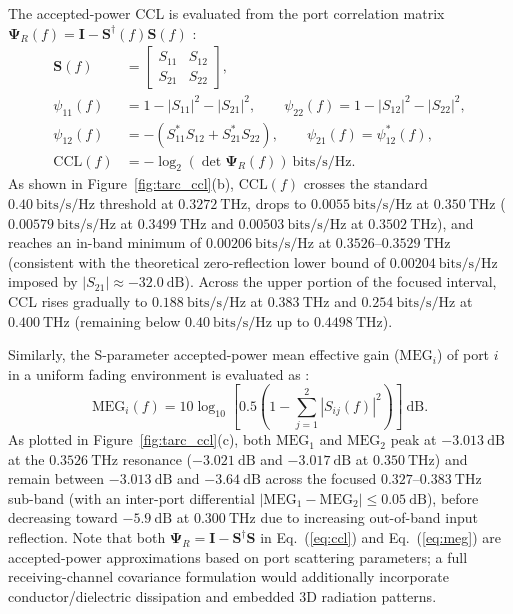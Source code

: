 \documentclass[referee,pdflatex,sn-mathphys-ay]{sn-jnl}
\begin{document}
The accepted-power CCL is evaluated from the port correlation matrix \(\boldsymbol{\Psi}_{R}(f)=\mathbf{I}-\mathbf{S}^{\dagger}(f)\mathbf{S}(f)\) \citep{MIMOReview2022}:
\begin{equation}
\begin{aligned}
\mathbf{S}(f)&=\begin{bmatrix}S_{11}&S_{12}\\S_{21}&S_{22}\end{bmatrix},\\
\psi_{11}(f)&=1-|S_{11}|^{2}-|S_{21}|^{2},\qquad
\psi_{22}(f)=1-|S_{12}|^{2}-|S_{22}|^{2},\\
\psi_{12}(f)&=-(S_{11}^{*}S_{12}+S_{21}^{*}S_{22}),\qquad
\psi_{21}(f)=\psi_{12}^{*}(f),\\
\mathrm{CCL}(f)&=-\log_{2}\!\left(\det\boldsymbol{\Psi}_{R}(f)\right)~\mathrm{bits/s/Hz}.
\end{aligned}
\label{eq:ccl}
\end{equation}
As shown in Figure~\ref{fig:tarc_ccl}(b), $\mathrm{CCL}(f)$ crosses the standard $0.40~\mathrm{bits/s/Hz}$ threshold at \(0.3272~\mathrm{THz}\), drops to \(0.0055~\mathrm{bits/s/Hz}\) at \(0.350~\mathrm{THz}\) ($0.00579~\mathrm{bits/s/Hz}$ at $0.3499~\mathrm{THz}$ and $0.00503~\mathrm{bits/s/Hz}$ at $0.3502~\mathrm{THz}$), and reaches an in-band minimum of \(0.00206~\mathrm{bits/s/Hz}\) at \(0.3526\)--\(0.3529~\mathrm{THz}\) (consistent with the theoretical zero-reflection lower bound of $0.00204~\mathrm{bits/s/Hz}$ imposed by $|S_{21}| \approx -32.0~\mathrm{dB}$). Across the upper portion of the focused interval, CCL rises gradually to \(0.188~\mathrm{bits/s/Hz}\) at \(0.383~\mathrm{THz}\) and \(0.254~\mathrm{bits/s/Hz}\) at \(0.400~\mathrm{THz}\) (remaining below $0.40~\mathrm{bits/s/Hz}$ up to $0.4498~\mathrm{THz}$).

Similarly, the S-parameter accepted-power mean effective gain (\(\mathrm{MEG}_{i}\)) of port \(i\) in a uniform fading environment is evaluated as \citep{MIMOReview2022}:
\begin{equation}
\mathrm{MEG}_{i}(f) = 10\log_{10}\!\left[0.5\left(1 - \sum_{j=1}^{2}|S_{ij}(f)|^{2}\right)\right]~\mathrm{dB}.
\label{eq:meg}
\end{equation}
As plotted in Figure~\ref{fig:tarc_ccl}(c), both $\mathrm{MEG}_1$ and $\mathrm{MEG}_2$ peak at \(-3.013~\mathrm{dB}\) at the $0.3526~\mathrm{THz}$ resonance (\(-3.021~\mathrm{dB}\) and \(-3.017~\mathrm{dB}\) at $0.350~\mathrm{THz}$) and remain between \(-3.013~\mathrm{dB}\) and \(-3.64~\mathrm{dB}\) across the focused \(0.327\)--\(0.383~\mathrm{THz}\) sub-band (with an inter-port differential $|\mathrm{MEG}_1 - \mathrm{MEG}_2| \le 0.05~\mathrm{dB}$), before decreasing toward \(-5.9~\mathrm{dB}\) at \(0.300~\mathrm{THz}\) due to increasing out-of-band input reflection. Note that both $\boldsymbol{\Psi}_R = \mathbf{I} - \mathbf{S}^\dagger\mathbf{S}$ in Eq.~(\ref{eq:ccl}) and Eq.~(\ref{eq:meg}) are accepted-power approximations based on port scattering parameters; a full receiving-channel covariance formulation would additionally incorporate conductor/dielectric dissipation and embedded 3D radiation patterns.
\end{document}
